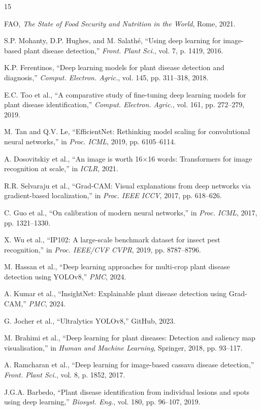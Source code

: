 \documentclass[conference]{IEEEtran}
\begin{document}
\begin{thebibliography}{15}

FAO, \textit{The State of Food Security and Nutrition in the World}, Rome, 2021.

S.P. Mohanty, D.P. Hughes, and M. Salathé, ``Using deep learning for image-based plant disease detection,'' \textit{Front. Plant Sci.}, vol. 7, p. 1419, 2016.

K.P. Ferentinos, ``Deep learning models for plant disease detection and diagnosis,'' \textit{Comput. Electron. Agric.}, vol. 145, pp. 311--318, 2018.

E.C. Too et al., ``A comparative study of fine-tuning deep learning models for plant disease identification,'' \textit{Comput. Electron. Agric.}, vol. 161, pp. 272--279, 2019.

M. Tan and Q.V. Le, ``EfficientNet: Rethinking model scaling for convolutional neural networks,'' in \textit{Proc. ICML}, 2019, pp. 6105--6114.

A. Dosovitskiy et al., ``An image is worth 16×16 words: Transformers for image recognition at scale,'' in \textit{ICLR}, 2021.

R.R. Selvaraju et al., ``Grad-CAM: Visual explanations from deep networks via gradient-based localization,'' in \textit{Proc. IEEE ICCV}, 2017, pp. 618--626.

C. Guo et al., ``On calibration of modern neural networks,'' in \textit{Proc. ICML}, 2017, pp. 1321--1330.

X. Wu et al., ``IP102: A large-scale benchmark dataset for insect pest recognition,'' in \textit{Proc. IEEE/CVF CVPR}, 2019, pp. 8787--8796.

M. Hassan et al., ``Deep learning approaches for multi-crop plant disease detection using YOLOv8,'' \textit{PMC}, 2024.

A. Kumar et al., ``InsightNet: Explainable plant disease detection using Grad-CAM,'' \textit{PMC}, 2024.

G. Jocher et al., ``Ultralytics YOLOv8,'' GitHub, 2023.

M. Brahimi et al., ``Deep learning for plant diseases: Detection and saliency map visualisation,'' in \textit{Human and Machine Learning}, Springer, 2018, pp. 93--117.

A. Ramcharan et al., ``Deep learning for image-based cassava disease detection,'' \textit{Front. Plant Sci.}, vol. 8, p. 1852, 2017.

J.G.A. Barbedo, ``Plant disease identification from individual lesions and spots using deep learning,'' \textit{Biosyst. Eng.}, vol. 180, pp. 96--107, 2019.

\end{thebibliography}
\end{document}
